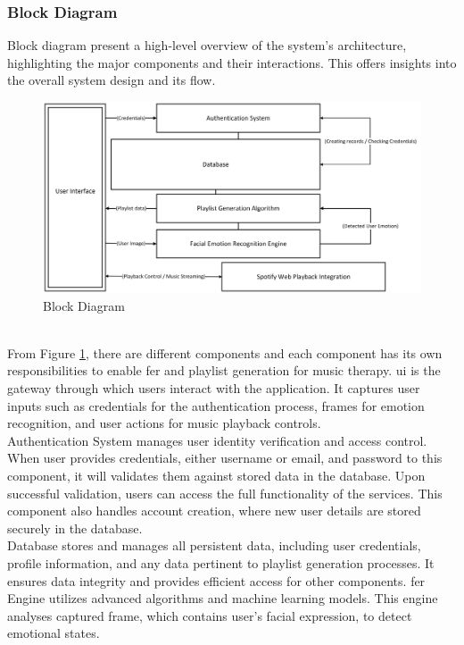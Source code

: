 \subsubsection{Block Diagram}
Block diagram present a high-level overview of the system's architecture, highlighting the major components and their interactions. \citep{freeman_block}
This offers insights into the overall system design and its flow.
\begin{figure}[!ht]
    \centering
    \includegraphics[width=12cm]{Images/block.png}
    \caption{Block Diagram}
    \label{fig:block}
\end{figure}
\\
\indent From Figure \ref{fig:block}, there are different components and each component has its own responsibilities to enable \gls{fer} and playlist generation for music therapy.
\gls{ui} is the gateway through which users interact with the application.
It captures user inputs such as credentials for the authentication process, frames for emotion recognition, and user actions for music playback controls.
\\
\indent Authentication System manages user identity verification and access control.
When user provides credentials, either username or email, and password to this component, it will validates them against stored data in the database. 
Upon successful validation, users can access the full functionality of the services.
This component also handles account creation, where new user details are stored securely in the database.
\\
\indent Database stores and manages all persistent data, including user credentials, profile information, and any data pertinent to playlist generation processes.
It ensures data integrity and provides efficient access for other components.
\gls{fer} Engine utilizes advanced algorithms and machine learning models.
This engine analyses captured frame, which contains user's facial expression, to detect emotional states.
